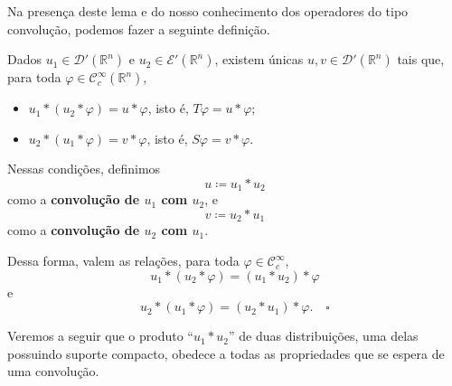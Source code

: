 \documentclass[../distribution_theory_notes.tex]{subfiles}
\begin{document}
Na presença deste lema e do nosso conhecimento dos operadores do tipo convolução, podemos fazer a seguinte definição.

\begin{def*}
	Dados \(u_{1}\in \mathcal{D}'(\mathbb{R}^{n})\) e \(u_{2}\in \mathcal{E}'(\mathbb{R}^{n})\), existem únicas \(u,v\in \mathcal{D}'(\mathbb{R}^{n})\) tais que, para toda \(\varphi\in \mathcal{C}_{c}^{\infty}(\mathbb{R}^{n})\),
	\begin{itemize}
		\item[(i)] \(u_{1}*(u_{2}*\varphi)=u*\varphi\), isto é, \(T\varphi=u*\varphi\);
		\item[(ii)] \(u_{2}*(u_{1}*\varphi)=v*\varphi\), isto é, \(S\varphi=v*\varphi\).
	\end{itemize}
	Nessas condições, definimos
	\[
		u\coloneqq u_{1}*u_{2}
	\]
	como a \textbf{convolução de \(u_{1}\) com \(u_{2}\)}, e
	\[
		v\coloneqq u_{2}*u_{1}
	\]
	como a \textbf{convolução de \(u_{2}\) com \(u_{1}\)}.

	Dessa forma, valem as relações, para toda \(\varphi\in \mathcal{C}_{c}^{\infty}\),
	\[
		u_{1}*(u_{2}*\varphi)=(u_{1}*u_{2})*\varphi
	\]
	e
	\[
		u_{2}*(u_{1}*\varphi)=(u_{2}*u_{1})*\varphi.\quad \square
	\]
\end{def*}

Veremos a seguir que o produto ``\(u_{1}*u_{2}\)'' de duas distribuições, uma delas possuindo suporte compacto, obedece a todas as propriedades que se espera de uma convolução.
\end{document}
